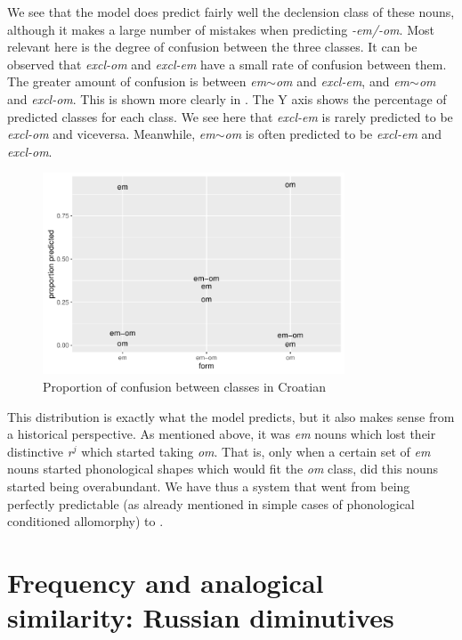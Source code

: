 We see that the model does predict fairly well the declension class of these nouns, although it makes a large number of mistakes when predicting \textit{-em/-om}. Most relevant here is the degree of confusion between the three classes. It can be observed that \textit{excl-om} and \textit{excl-em} have a small rate of confusion between them. The greater amount of confusion is between \textit{em}$\sim$\textit{om} and \textit{excl-em}, and \textit{em}$\sim$\textit{om} and \textit{excl-om}. This is shown more clearly in . The Y axis shows the percentage of predicted classes for each class. We see here that  \textit{excl-em} is rarely predicted to be  \textit{excl-om} and viceversa. Meanwhile, \textit{em}$\sim$\textit{om} is often predicted to be \textit{excl-em} and \textit{excl-om}.

\begin{figure}
  \centering
  \includegraphics[width=0.8\textwidth]{./figures/croatian/croatian.pdf}
  \caption{Proportion of confusion between classes in Croatian}\label{fig:croatian-results}
\end{figure}

\largerpage[2]
This distribution is exactly what the model predicts, but it also makes sense from a historical perspective. As mentioned above, it was \textit{em} nouns which lost their distinctive \textit{r}$^j$ which started taking \textit{om}. That is, only when a certain set of \textit{em} nouns started phonological shapes which would fit the \textit{om} class, did this nouns started being overabundant. We have thus a system that went from being perfectly predictable (as already mentioned in simple cases of phonological conditioned allomorphy) to .


\section{Frequency and analogical similarity: Russian diminutives}

